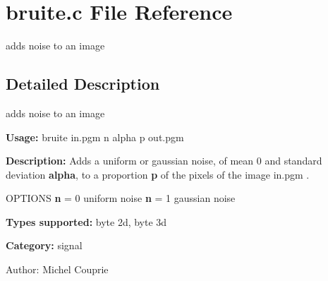 \section{bruite.c File Reference}
\label{bruite_8c}
adds noise to an image 



\subsection{Detailed Description}
adds noise to an image 

{\bf Usage:} bruite in.pgm n alpha p out.pgm

{\bf Description:} Adds a uniform or gaussian noise, of mean 0 and standard deviation {\bf alpha}, to a proportion {\bf p} of the pixels of the image in.pgm .

OPTIONS {\bf n} = 0 uniform noise {\bf n} = 1 gaussian noise

{\bf Types supported:} byte 2d, byte 3d

{\bf Category:} signal

\begin{Desc}
\item[Author:]Michel Couprie \end{Desc}
